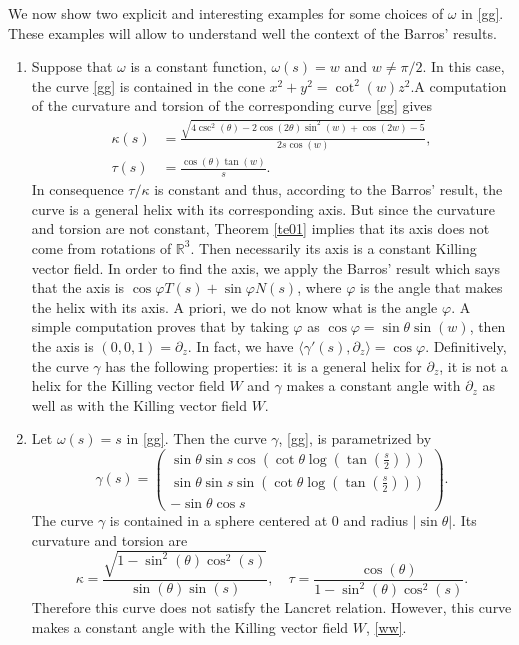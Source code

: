 \documentclass[a4paper,12pt]{amsart}
\theoremstyle{definition}
\def\r{\mathbb R}
\begin{document}
We now show two explicit and interesting examples for some choices of $\omega$ in \eqref{gg}. These examples will allow to understand well the context of the Barros' results.
\begin{enumerate}
\item Suppose that  $\omega$ is a constant function,  $\omega(s)=w$ and $w\not=\pi/2$. In this case,  the curve \eqref{gg}   is contained in the cone $x^2+y^2=\cot^2(w) z^2$.A computation of the curvature and torsion of the corresponding curve \eqref{gg} gives 
\begin{equation*}
\begin{split}
\kappa(s)&=\frac{\sqrt{4 \csc ^2(\theta )-2 \cos (2 \theta ) \sin ^2(w)+\cos (2 w)-5}}{2 s \cos (w)},\\
\tau(s)&=\frac{\cos (\theta ) \tan (w)}{s}.
\end{split}
\end{equation*}
In consequence $\tau/\kappa$ is constant and thus, according to the Barros' result, the curve is a general helix with its corresponding axis. But since the curvature and torsion are not constant, Theorem \ref{te01} implies that its axis does not come from rotations of $\r^3$. Then necessarily its axis is a constant Killing vector field.    In order to find the axis, we apply the Barros' result which says that the axis is $\cos\varphi T(s)+\sin\varphi N(s)$, where $\varphi$ is the angle that makes the helix with its axis. A priori, we do not know what is the angle $\varphi$. A simple computation proves that by taking $\varphi$ as $\cos\varphi=\sin\theta\sin(w)$, then the axis is $(0,0,1)=\partial_z$. In fact, we have  $\langle\gamma'(s),\partial_z\rangle=\cos\varphi$. Definitively, the curve $\gamma$ has the following properties: it is a general helix for $\partial_z$, it is not a helix for the Killing vector field  $W$ and $\gamma$ makes a constant angle with $\partial_z$ as well as with the Killing vector field $W$.
 
\item Let $\omega(s)=s$ in \eqref{gg}. Then the curve $\gamma$, \eqref{gg}, is parametrized by  
$$\gamma(s)=\left(\begin{array}{l}
\sin \theta \sin s \cos \left(\cot \theta  \log \left(\tan \left(\frac{s}{2}\right)\right)\right)\\
\sin \theta  \sin s \sin \left(\cot \theta  \log \left(\tan \left(\frac{s}{2}\right)\right)\right)\\
-\sin \theta\cos s\end{array}
\right).$$
The curve $\gamma$ is contained in a sphere centered at $0$ and radius $|\sin\theta|$. Its curvature and torsion are
$$\kappa=\frac{\sqrt{1-\sin ^2(\theta ) \cos ^2(s)}}{\sin (\theta ) \sin (s)},\quad \tau=\frac{\cos (\theta )}{1-\sin ^2(\theta ) \cos ^2(s)}.$$
Therefore this curve does not satisfy the Lancret relation. However, this curve makes a constant angle with the Killing vector field $W$, \eqref{ww}.
\end{enumerate}
\end{document}
